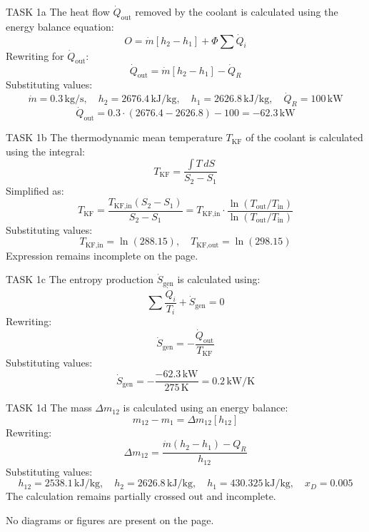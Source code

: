 TASK 1a  
The heat flow \( \dot{Q}_{\text{out}} \) removed by the coolant is calculated using the energy balance equation:  
\[
O = \dot{m} [h_2 - h_1] + \Phi \sum \dot{Q}_i
\]  
Rewriting for \( \dot{Q}_{\text{out}} \):  
\[
\dot{Q}_{\text{out}} = \dot{m} [h_2 - h_1] - \dot{Q}_R
\]  
Substituting values:  
\[
\dot{m} = 0.3 \, \text{kg/s}, \quad h_2 = 2676.4 \, \text{kJ/kg}, \quad h_1 = 2626.8 \, \text{kJ/kg}, \quad \dot{Q}_R = 100 \, \text{kW}
\]  
\[
\dot{Q}_{\text{out}} = 0.3 \cdot (2676.4 - 2626.8) - 100 = -62.3 \, \text{kW}
\]  

TASK 1b  
The thermodynamic mean temperature \( T_{\text{KF}} \) of the coolant is calculated using the integral:  
\[
T_{\text{KF}} = \frac{\int T \, dS}{S_2 - S_1}
\]  
Simplified as:  
\[
T_{\text{KF}} = \frac{T_{\text{KF,in}} (S_2 - S_1)}{S_2 - S_1} = T_{\text{KF,in}} \cdot \frac{\ln(T_{\text{out}} / T_{\text{in}})}{\ln(T_{\text{out}} / T_{\text{in}})}
\]  
Substituting values:  
\[
T_{\text{KF,in}} = \ln(288.15), \quad T_{\text{KF,out}} = \ln(298.15)
\]  
Expression remains incomplete on the page.  

TASK 1c  
The entropy production \( \dot{S}_{\text{gen}} \) is calculated using:  
\[
\sum \frac{\dot{Q}_i}{T_i} + \dot{S}_{\text{gen}} = 0
\]  
Rewriting:  
\[
\dot{S}_{\text{gen}} = -\frac{\dot{Q}_{\text{out}}}{T_{\text{KF}}}
\]  
Substituting values:  
\[
\dot{S}_{\text{gen}} = -\frac{-62.3 \, \text{kW}}{275 \, \text{K}} = 0.2 \, \text{kW/K}
\]  

TASK 1d  
The mass \( \Delta m_{12} \) is calculated using an energy balance:  
\[
m_{12} - m_{1} = \Delta m_{12} [h_{12}]
\]  
Rewriting:  
\[
\Delta m_{12} = \frac{\dot{m} (h_2 - h_1) - Q_R}{h_{12}}
\]  
Substituting values:  
\[
h_{12} = 2538.1 \, \text{kJ/kg}, \quad h_2 = 2626.8 \, \text{kJ/kg}, \quad h_1 = 430.325 \, \text{kJ/kg}, \quad x_D = 0.005
\]  
The calculation remains partially crossed out and incomplete.  

No diagrams or figures are present on the page.